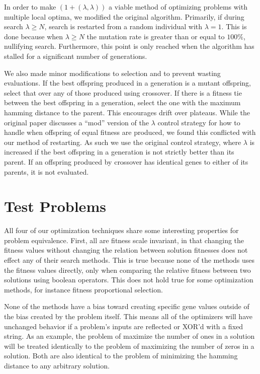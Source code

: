 \documentclass{sig-alternate}
\begin{document}
In order to make $(1+(\lambda,\lambda))$ a viable method of optimizing problems
with multiple local optima, we modified the original algorithm.  Primarily, if
during search $\lambda \ge N$, search is restarted from a random individual with
$\lambda=1$.  This is done because when $\lambda \ge N$ the mutation rate is greater
than or equal to $100\%$, nullifying search.  Furthermore, this point is only reached
when the algorithm has stalled for a significant number of generations.

We also made minor modifications to selection and to prevent wasting evaluations.
If the best offspring produced in a generation is a mutant offspring, select that
over any of those produced using crossover.  If there is a fitness tie between the
best offspring in a generation, select the one with the maximum hamming distance
to the parent.  This encourages drift over plateaus.  While the original paper
discusses a ``mod'' version of the $\lambda$ control strategy for how to handle
when offspring of equal fitness are produced, we found this conflicted with our
method of restarting.  As such we use the original control strategy, where $\lambda$
is increased if the best offspring in a generation is not strictly better than its parent.
If an offspring produced by crossover has identical genes to either of its parents,
it is not evaluated.

\section{Test Problems}
All four of our optimization techniques share some interesting properties for
problem equivalence.  First, all are fitness scale invariant, in that changing
the fitness values without changing the relation between solution fitnesses does
not effect any of their search methods.  This is true because none of the methods
uses the fitness values directly, only when comparing the relative fitness between
two solutions using boolean operators.  This does not hold true for some optimization
methods, for instance fitness proportional selection.

None of the methods have a bias toward creating specific gene values outside
of the bias created by the problem itself.  This means all of the optimizers
will have unchanged behavior if a problem's inputs are reflected or XOR'd with a fixed string.  As
an example, the problem of maximize the number of ones in a solution will be treated identically
to the problem of maximizing the number of zeros in a solution.  Both are also identical
to the problem of minimizing the hamming distance to any arbitrary solution.
\end{document}
